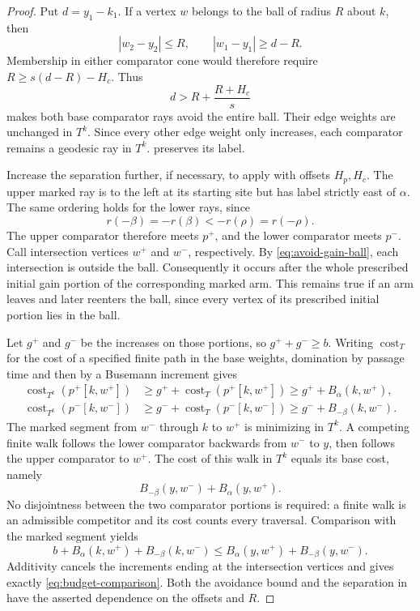 \begin{proof}
Put $d=y_1-k_1$.  If a vertex $w$ belongs to the ball of radius $R$ about
$k$, then
\[
 |w_2-y_2|\le R,
 \qquad |w_1-y_1|\ge d-R.
\]
Membership in either comparator cone would therefore require
$R\ge s(d-R)-H_c$.  Thus
\begin{equation}\label{eq:avoid-gain-ball}
 d>R+\frac{R+H_c}{s}
\end{equation}
makes both base comparator rays avoid the entire ball.  Their edge
weights are unchanged in $T^k$.  Since every other edge weight only
increases, each comparator remains a geodesic ray in $T^k$.
 preserves its label.

Increase the separation further, if necessary, to apply
 with offsets $H_p,H_c$.  The upper marked ray is to
the left at its starting site but has label strictly east of $\alpha$.
The same ordering holds for the lower rays, since
\[
 r(-\beta)=-r(\beta)<-r(\rho)=r(-\rho).
\]
The upper comparator therefore meets $p^+$, and the lower comparator
meets $p^-$.  Call intersection vertices $w^+$ and $w^-$, respectively.
By \eqref{eq:avoid-gain-ball}, each intersection is outside the ball.
Consequently it occurs after the whole prescribed initial gain portion
of the corresponding marked arm.  This remains true if an arm leaves
and later reenters the ball, since every vertex of its prescribed initial
portion lies in the ball.

Let $g^+$ and $g^-$ be the increases on those portions, so
$g^++g^-\ge b$.  Writing $\operatorname{cost}_T$ for the cost of a
specified finite path in the base weights, domination by passage time and
then by a Busemann increment gives
\[
 \begin{split}
 \operatorname{cost}_{T^k}(p^+[k,w^+])
 &\ge g^++\operatorname{cost}_T(p^+[k,w^+])
 \ge g^++B_\alpha(k,w^+),\\
 \operatorname{cost}_{T^k}(p^-[k,w^-])
 &\ge g^-+\operatorname{cost}_T(p^-[k,w^-])
 \ge g^-+B_{-\beta}(k,w^-).
 \end{split}
\]
The marked segment from $w^-$ through $k$ to $w^+$ is minimizing in
$T^k$.  A competing finite walk follows the lower comparator backwards
from $w^-$ to $y$, then follows the upper comparator to $w^+$.
The cost of this walk in $T^k$ equals its base cost, namely
\[
 B_{-\beta}(y,w^-)+B_\alpha(y,w^+).
\]
No disjointness between the two comparator portions is required: a finite
walk is an admissible competitor and its cost counts every traversal.
Comparison with the marked segment yields
\[
 b+B_\alpha(k,w^+)+B_{-\beta}(k,w^-)
 \le B_\alpha(y,w^+)+B_{-\beta}(y,w^-).
\]
Additivity cancels the increments ending at the intersection vertices
and gives exactly \eqref{eq:budget-comparison}.  Both the avoidance bound
and the separation in  have the asserted dependence
on the offsets and $R$.
\end{proof}

